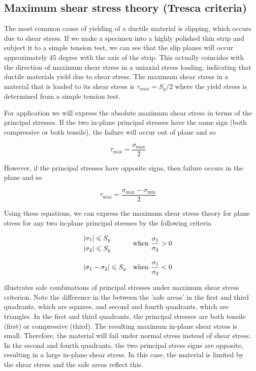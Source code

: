 \documentclass[a4paper,openany,12pt]{book}
\begin{document}
\subsection{Maximum shear stress theory (Tresca criteria)}
\label{maximum-shear-stress-theory-tresca-criteria}
The most common cause of yielding of a ductile material is slipping,
which occurs due to shear stress. If we make a specimen into a highly
polished thin strip and subject it to a simple tension test, we can see
that the slip planes will occur approximately 45 degree with the axis of
the strip. This actually coincides with the direction of maximum shear
stress in a uniaxial stress loading, indicating that ductile materials
yield due to shear stress. The maximum shear stress in a material that
is loaded to its shear stress is \(\tau_{max} = S_y / 2\) where the yield
stress is determined from a simple tension test.

For application we will express the absolute maximum shear stress in
terms of the principal stresses. If the two in-plane principal stresses
have the same sign (both compressive or both tensile), the failure will
occur out of plane and so

$$\tau _{\max } = \frac{\sigma _{\max }}{2}$$

However, if the principal stresses have opposite signs, then failure
occurs in the plane and so

$$\tau _{\max } = \frac{\sigma_{\max } - \sigma _{\min }}{2}$$

Using these equations, we can express the maximum shear stress theory
for plane stress for any two in-plane principal stresses by the
following criteria

$$\begin{array}{l l}
    \begin{gathered}
      \left| \sigma_1 \right| \leqslant S_y \hfill \\
      \left| \sigma_2 \right| \leqslant S_y \hfill \\ 
    \end{gathered}  &\text{when } \dfrac{\sigma _1}{\sigma _2} > 0  \\[20pt]
    \left| \sigma _1 - \sigma _2 \right| \leqslant S_y &\text{when } \dfrac{\sigma _1}{\sigma _2} < 0 \\ 
  \end{array}$$


illustrates safe combinations of principal stresses under maximum shear
stress criterion. Note the difference in the between the 'safe areas' in
the first and third quadrants, which are squares, and second and fourth
quadrants, which are triangles. In the first and third quadrants, the
principal stresses are both tensile (first) or compressive (third). The
resulting maximum in-plane shear stress is small. Therefore, the
material will fail under normal stress instead of shear stress. In the
second and fourth quadrants, the two principal stress signs are
opposite, resulting in a large in-plane shear stress. In this case, the
material is limited by the shear stress and the safe areas reflect this.
\end{document}
